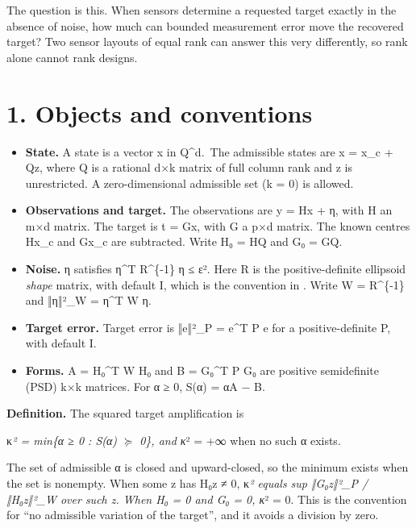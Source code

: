 \documentclass[
  11pt,
  a4paper,
]{report}
\providecommand{\tightlist}{%
  \setlength{\itemsep}{0pt}\setlength{\parskip}{0pt}}
\let\singularitytexttt\texttt
\renewcommand{\texttt}[1]{\singularitytexttt{\seqsplit{#1}}}
\begin{document}
The question is this. When sensors determine a requested target exactly
in the absence of noise, how much can bounded measurement error move the
recovered target? Two sensor layouts of equal rank can answer this very
differently, so rank alone cannot rank designs.

\hypertarget{objects-and-conventions}{%
\section{1. Objects and conventions}\label{objects-and-conventions}}

\begin{itemize}
\tightlist
\item
  \textbf{State.} A state is a vector x in Q\textasciicircum{}d.~The admissible states
  are x = x\_c + Qz, where Q is a rational d×k matrix of full column
  rank and z is unrestricted. A zero-dimensional admissible set (k = 0)
  is allowed.
\item
  \textbf{Observations and target.} The observations are y = Hx + η,
  with H an m×d matrix. The target is t = Gx, with G a p×d matrix. The
  known centres Hx\_c and Gx\_c are subtracted. Write H₀ = HQ and G₀ =
  GQ.
\item
  \textbf{Noise.} η satisfies η\textasciicircum{}T R\textasciicircum{}\{-1\} η ≤ ε². Here R is the
  positive-definite ellipsoid \emph{shape} matrix, with default I, which
  is the convention in \texttt{INTERCHANGE\_CONTRACT.md}. Write W =
  R\textasciicircum{}\{-1\} and ‖η‖²\_W = η\textasciicircum{}T W η.
\item
  \textbf{Target error.} Target error is ‖e‖²\_P = e\textasciicircum{}T P e for a
  positive-definite P, with default I.
\item
  \textbf{Forms.} A = H₀\textasciicircum{}T W H₀ and B = G₀\textasciicircum{}T P G₀ are positive
  semidefinite (PSD) k×k matrices. For α ≥ 0, S(α) = αA − B.
\end{itemize}

\textbf{Definition.} The squared target amplification is

κ\emph{² = min\{α ≥ 0 : S(α) \(\succeq\) 0\}, and κ}² = +∞ when no such
α exists.

The set of admissible α is closed and upward-closed, so the minimum
exists when the set is nonempty. When some z has H₀z ≠ 0, κ\emph{²
equals sup ‖G₀z‖²\_P / ‖H₀z‖²\_W over such z. When H₀ = 0 and G₀ = 0,
κ}² = 0. This is the convention for ``no admissible variation of the
target'', and it avoids a division by zero.
\end{document}
